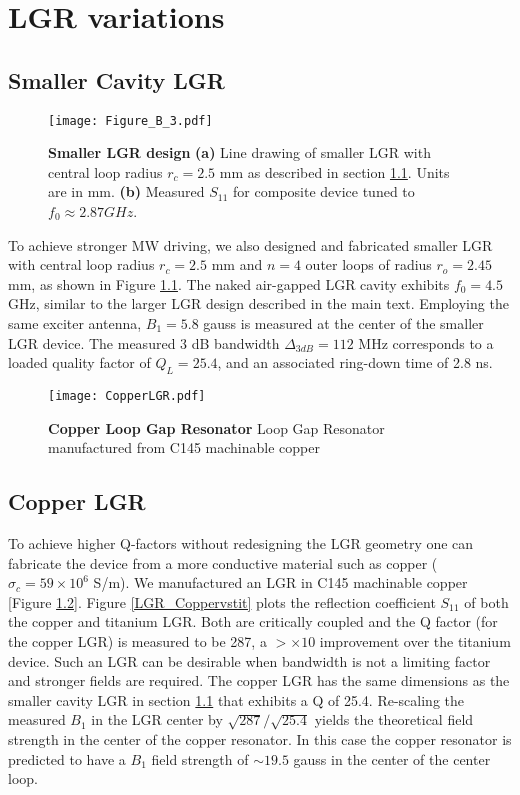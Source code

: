 \chapter{LGR variations} %

\section{Smaller Cavity LGR} \label{smallLGR}
\begin{figure}[b!]
\centering
\texttt{[image: Figure\_B\_3.pdf]}  
\caption{\textbf{Smaller LGR design} \textbf{(a)} Line drawing of smaller LGR with central loop radius $r_c = 2.5$ mm as described in section \ref{smallLGR}. Units are in mm. \textbf{(b)} Measured $S_{11}$ for composite device tuned to $f_0 \approx 2.87 GHz$.}
\label{smallLGRfigure}
\end{figure}   
To achieve stronger MW driving, we also designed and fabricated
smaller LGR with central loop radius $r_c = 2.5$ mm and $n = 4$ outer loops of radius $r_o = 2.45$ mm, as shown in Figure \ref{smallLGRfigure}. The naked air-gapped LGR cavity exhibits $f_0 = 4.5$ GHz, similar to the larger LGR design described in the main text. Employing the same exciter antenna, $B_1 = 5.8$ gauss is measured at the center of the smaller LGR device. The measured 3 dB bandwidth $\Delta_{3dB} = 112$ MHz corresponds to a loaded quality factor of $Q_L = 25.4$, and an associated ring-down time of 2.8 ns.


\begin{figure}[t!]
\centering
\texttt{[image: CopperLGR.pdf]}  
\caption{\textbf{Copper Loop Gap Resonator} Loop Gap Resonator manufactured from C145 machinable copper}
\label{LGR_Copper}
\end{figure}   


\section{Copper LGR} \label{CopperLGR}

To achieve higher Q-factors without redesigning the LGR geometry one can fabricate the device from a more conductive material such as copper ($\sigma_c = 59 \times 10^6$ S/m). We manufactured an LGR in C145 machinable copper [Figure \ref{LGR_Copper}]. Figure \ref{LGR_Coppervstit} plots the reflection coefficient $S_{11}$ of both the copper and titanium LGR. Both are critically coupled and the Q factor (for the copper LGR) is measured to be 287, a $>\times 10$ improvement over the titanium device. Such an LGR can be desirable when bandwidth is not a limiting factor and stronger fields are required. The copper LGR has the same dimensions as the smaller cavity LGR in section \ref{smallLGR} that exhibits a Q of 25.4. Re-scaling the measured $B_1$ in the LGR center by $\sqrt{287}/\sqrt{25.4}$ yields the theoretical field strength in the center of the copper resonator. In this case the copper resonator is predicted to have a $B_1$ field strength of $\sim 19.5$ gauss in the center of the center loop.  

